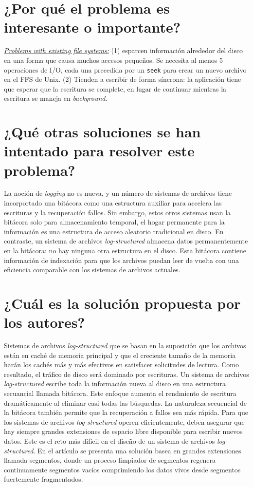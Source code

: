 \section{¿Por qué el problema es interesante o importante?}
\underline{\emph{Problems with existing file systems:}} (1) esparcen información alrededor del disco en una forma que causa muchos accesos pequeños. Se necesita al menos 5 operaciones de I/O, cada una precedida por un \texttt{seek} para crear un nuevo archivo en el FFS de Unix. (2) Tienden a escribir de forma síncrona: la aplicación tiene que esperar que la escritura se complete, en lugar de continuar mientras la escritura se maneja en \emph{background}. 

\section{¿Qué otras soluciones se han intentado para resolver este problema?}
La noción de \emph{logging} no es nueva, y un número de sistemas de archivos tiene incorportado una bitácora como una estructura auxiliar para accelera las escrituras y la recuperación fallos. Sin embargo, estos otros sistemas usan la bitácora solo para almacenamiento temporal, el hogar permanente para la información es una estructura de acceso aleatorio tradicional en disco. En contraste, un sistema de archivos \emph{log-structured} almacena datos permanentemente en la bitácora: no hay ninguna otra estructura en el disco. Esta bitácora contiene información de indexación para que los archivos puedan leer de vuelta con una eficiencia comparable con los sistemas de archivos actuales.
     
\section{¿Cuál es la solución propuesta por los autores?}
Sistemas de archivos \emph{log-structured} que se basan en la suposición que los archivos están en caché de memoria principal y que el creciente tamaño de la memoria harán los cachés más y más efectivos en satisfacer solicitudes de lectura. Como resultado, el tráfico de disco será dominado por escrituras. Un sistema de archivos \emph{log-structured} escribe toda la información nueva al disco en una estructura secuancial llamada bitácora. Este enfoque aumenta el rendmiento de escritura dramáticamente al eliminar casi todas las búsquedas. La naturaleza secuencial de la bitácora también permite que la recuperación a fallos sea más rápida. Para que los sistemas de archivos \emph{log-structured} operen eficientemente, deben asegurar que hay siempre grandes extensiones de espacio libre disponible para escribir nuevos datos. Este es el reto más difícil en el diseño de un sistema de archivos \emph{log-structured}. En el artículo se presenta una solución basea en grandes extensiones llamada segmentos, donde un proceso limpiador de segmentos regenera continuamente segmentos vacíos comprimiendo los datos vivos desde segmentos fuertemente fragmentados.

